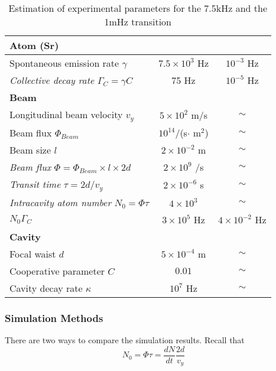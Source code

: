 \documentclass{article}
\newcommand{\gc}{\Gamma_C}
\begin{document}
\begin{table}[h!]
\begin{center}
\begin{tabular}{ |l |c|c|  }
\hline
\textbf{Atom (Sr)} & & \\\hline
Spontaneous emission rate $\gamma$ & $7.5\times10^3$ Hz& $10^{-3}$ Hz \\\hline
\textit{Collective decay rate} $\gc = \gamma C$  & 75 Hz & $10^{-5}$ Hz\\\hline
\textbf{Beam} & & \\\hline
Longitudinal beam velocity $v_y$ & $5\times 10^2$ m/s & $\sim$\\\hline
Beam flux $\Phi_{Beam}$ & $10^{14}$/(s$\cdot$ m$^2$) & $\sim$\\\hline
Beam size $l$ & $2\times10^{-2}$ m & $\sim$\\\hline
\textit{Beam flux} $\Phi=\Phi_{Beam}\times l \times 2d$  & $2\times10^{9}$ /s& $\sim$\\\hline
\textit{Transit time} $\tau=2d/v_y$ & $2\times 10^{-6}$ s& $\sim$\\\hline
\textit{Intracavity atom number} $N_0=\Phi \tau$ & $4\times 10^3$& $\sim$\\\hline
$N_0\gc$ & $3\times 10^{5}$ Hz &$4\times 10^{-2}$ Hz\\\hline
\textbf{Cavity} & &\\\hline
Focal waist $d$  & $5\times10^{-4}$ m& $\sim$\\\hline
Cooperative parameter $C$ & $0.01$& $\sim$\\\hline
Cavity decay rate $\kappa$ & $10^7$ Hz& $\sim$\\\hline
\end{tabular}
\end{center}
\caption{Estimation of experimental parameters for the 7.5kHz and the 1mHz transition}
\label{param7.5k}
\end{table}

\subsubsection{Simulation Methods}
There are two ways to compare the simulation results. Recall that
\begin{equation}
    N_0 =\Phi\tau=\frac{dN}{dt}\frac{2d}{v_y} 
\end{equation}
\end{document}
